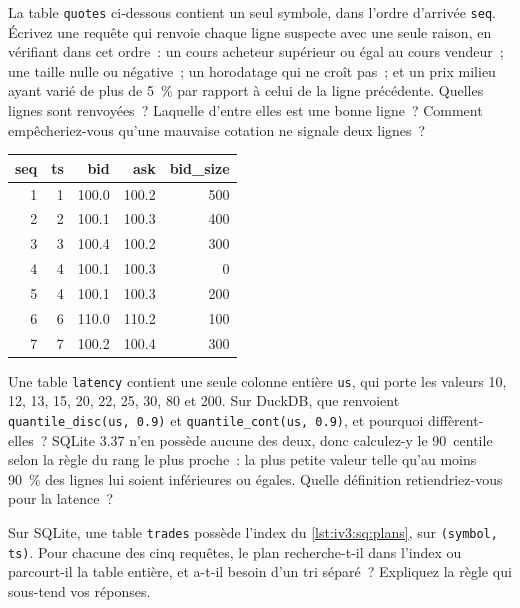 \begin{question}\label{iq:iv3:sql-and-data:15}
La table \texttt{quotes} ci-dessous contient un seul symbole, dans l'ordre d'arrivée \texttt{seq}. Écrivez une requête qui renvoie chaque ligne suspecte avec une seule raison, en vérifiant dans cet ordre~: un cours acheteur supérieur ou égal au cours vendeur~; une taille nulle ou négative~; un horodatage qui ne croît pas~; et un prix milieu ayant varié de plus de 5~\% par rapport à celui de la ligne précédente. Quelles lignes sont renvoyées~? Laquelle d'entre elles est une bonne ligne~? Comment empêcheriez-vous qu'une mauvaise cotation ne signale deux lignes~?
\begin{center}\small
\begin{tabular}{rrrrr}
seq & ts & bid & ask & bid\_size\\\hline
1 & 1 & 100.0 & 100.2 & 500\\
2 & 2 & 100.1 & 100.3 & 400\\
3 & 3 & 100.4 & 100.2 & 300\\
4 & 4 & 100.1 & 100.3 & 0\\
5 & 4 & 100.1 & 100.3 & 200\\
6 & 6 & 110.0 & 110.2 & 100\\
7 & 7 & 100.2 & 100.4 & 300
\end{tabular}
\end{center}
\end{question}

\begin{question}\label{iq:iv3:sql-and-data:16}
Une table \texttt{latency} contient une seule colonne entière \texttt{us}, qui porte les valeurs 10, 12, 13, 15, 20, 22, 25, 30, 80 et 200. Sur DuckDB, que renvoient \texttt{quantile\_disc(us, 0.9)} et \texttt{quantile\_cont(us, 0.9)}, et pourquoi diffèrent-elles~? SQLite 3.37 n'en possède aucune des deux, donc calculez-y le 90~centile selon la règle du rang le plus proche~: la plus petite valeur telle qu'au moins 90~\% des lignes lui soient inférieures ou égales. Quelle définition retiendriez-vous pour la latence~?
\end{question}

\begin{question}\label{iq:iv3:sql-and-data:17}
Sur SQLite, une table \texttt{trades} possède l'index du \cref{lst:iv3:sq:plans}, sur \texttt{(symbol, ts)}. Pour chacune des cinq requêtes, le plan recherche-t-il dans l'index ou parcourt-il la table entière, et a-t-il besoin d'un tri séparé~? Expliquez la règle qui sous-tend vos réponses.
\label{lst:iv3:sq:plans}
\end{question}

